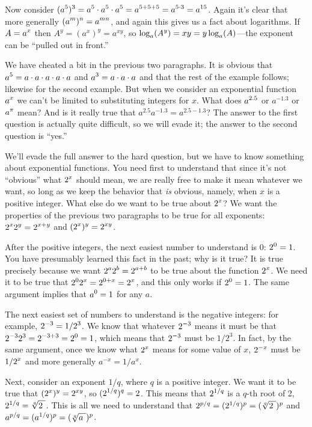 Now consider $\displaystyle (a^5)^3=a^5\cdot a^5\cdot a^5=a^{5+5+5}=a^{5\cdot 3}=a^{15}$.
Again it's clear that more generally $\displaystyle (a^m)^n=a^{mn}$, and again this
gives us a fact about logarithms. If $\displaystyle A=a^x$ then
$A^y=(a^x)^y=a^{xy}$, so $\displaystyle \log_a(A^y)=xy=y\log_a(A)$---the exponent
can be ``pulled out in front.''

We have cheated a bit in the previous two paragraphs. It is obvious
that $\displaystyle a^5=a\cdot a\cdot a\cdot a\cdot a$ and $\displaystyle a^3=a\cdot a\cdot a$ and
that the rest of the example follows; likewise for the second
example. But when we consider an exponential function $\displaystyle a^x$ we can't
be limited to substituting integers for $x$. What does $\displaystyle a^{2.5}$ or
$a^{-1.3}$ or $\displaystyle a^\pi$ mean? And is it really true that
$a^{2.5}a^{-1.3}=a^{2.5-1.3}$? The answer to the first question is
actually quite difficult, so we will evade it; the answer to the
second question is ``yes.''

We'll evade the full answer to the hard question, but we have to know
something about exponential functions. You need first to understand
that since it's not ``obvious'' what $\displaystyle 2^x$ should mean, we are really
free to make it mean whatever we want, so long as we keep the behavior
that {\em is\/} obvious, namely, when $x$ is a positive integer.
What else do we want to be true about $\displaystyle 2^x$? We
want the properties of the previous two paragraphs to be true for all
exponents: $\displaystyle 2^x2^y=2^{x+y}$ and $\displaystyle (2^x)^y=2^{xy}$.

After the positive integers, the next easiest
number to understand is 0: $\displaystyle 2^0=1$. You have presumably learned this
fact in the past; why is it true?  It
is true precisely because we want $\displaystyle 2^a2^b=2^{a+b}$ to be true about
the function $\displaystyle 2^x$. We need it to be true that $\displaystyle 2^02^x=2^{0+x}=2^x$,
and this only works if $\displaystyle 2^0=1$. The same argument implies that $\displaystyle a^0=1$
for any $a$.

The next
easiest set of numbers to
understand is the negative integers: for example, $\displaystyle 2^{-3}=1/2^3$. 
We know that whatever $\displaystyle 2^{-3}$ means it must be
that $\displaystyle 2^{-3}2^{3}=2^{-3+3}=2^0=1$, which means that $\displaystyle 2^{-3}$ must be
$1/2^3$. In fact, by the same argument, once we know what $\displaystyle 2^x$ means
for some value of $x$, $\displaystyle 2^{-x}$ must be $\displaystyle 1/2^{x}$ and more generally
$a^{-x}=1/a^x$.

Next, consider an exponent $1/q$, where $q$ is a positive integer. We
want it to be true that $\displaystyle (2^x)^y=2^{xy}$, so $\displaystyle
(2^{1/q})^q=2$. This means that $\displaystyle 2^{1/q}$ is a $q$-th root of 2,
$\ds 2^{1/q}=\root q\of{2\ }$. This is all we need to understand that
$2^{p/q}=(2^{1/q})^p=(\root q\of{2\ })^p$ and
$a^{p/q}=(a^{1/q})^p=(\root q\of{a\ })^p$.

